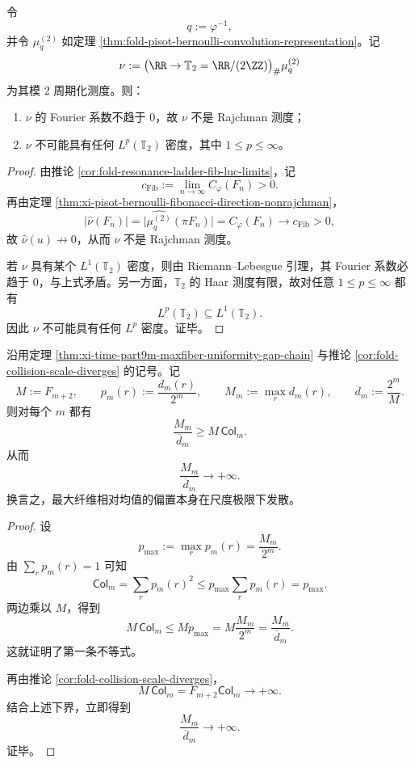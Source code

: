 \begin{corollary}\label{cor:xi-time-part66-periodized-bernoulli-nonrajchman-no-lp}
令
\[
q:=\varphi^{-1},
\]
并令 \(\mu_q^{(2)}\) 如定理 \ref{thm:fold-pisot-bernoulli-convolution-representation}。记
\[
\nu:=\bigl(\RR\to \mathbb T_2=\RR/(2\ZZ)\bigr)_\#\mu_q^{(2)}
\]
为其模 \(2\) 周期化测度。则：
\begin{enumerate}
  \item \(\nu\) 的 Fourier 系数不趋于 \(0\)，故 \(\nu\) 不是 Rajchman 测度；
  \item \(\nu\) 不可能具有任何 \(L^p(\mathbb T_2)\) 密度，其中 \(1\le p\le \infty\)。
\end{enumerate}
\end{corollary}
\begin{proof}
由推论 \ref{cor:fold-resonance-ladder-fib-luc-limits}，记
\[
c_{\mathrm{Fib}}:=\lim_{n\to\infty}C_\varphi(F_n)>0.
\]
再由定理 \ref{thm:xi-pisot-bernoulli-fibonacci-direction-nonrajchman}，
\[
\bigl|\widehat\nu(F_n)\bigr|
=
\bigl|\widehat{\mu_q^{(2)}}(\pi F_n)\bigr|
=
C_\varphi(F_n)
\longrightarrow
c_{\mathrm{Fib}}>0,
\]
故 \(\widehat\nu(u)\not\to 0\)，从而 \(\nu\) 不是 Rajchman 测度。

若 \(\nu\) 具有某个 \(L^1(\mathbb T_2)\) 密度，则由 Riemann--Lebesgue 引理，其 Fourier 系数必趋于 \(0\)，与上式矛盾。另一方面，\(\mathbb T_2\) 的 Haar 测度有限，故对任意 \(1\le p\le\infty\) 都有
\[
L^p(\mathbb T_2)\subseteq L^1(\mathbb T_2).
\]
因此 \(\nu\) 不可能具有任何 \(L^p\) 密度。证毕。
\end{proof}

\begin{theorem}[最大纤维相对均值的放大因子无界]\label{thm:xi-time-part66-maxfiber-over-mean-diverges}
沿用定理 \ref{thm:xi-time-part9m-maxfiber-uniformity-gap-chain} 与推论
\ref{cor:fold-collision-scale-diverges} 的记号。记
\[
M:=F_{m+2},
\qquad
p_m(r):=\frac{d_m(r)}{2^m},
\qquad
M_m:=\max_r d_m(r),
\qquad
\overline d_m:=\frac{2^m}{M}.
\]
则对每个 \(m\) 都有
\[
\boxed{\;
\frac{M_m}{\overline d_m}\ge M\,\mathsf{Col}_m.\;}
\]
从而
\[
\boxed{\;
\frac{M_m}{\overline d_m}\longrightarrow +\infty.\;}
\]
换言之，最大纤维相对均值的偏置本身在尺度极限下发散。
\end{theorem}
\begin{proof}
设
\[
p_{\max}:=\max_r p_m(r)=\frac{M_m}{2^m}.
\]
由 \(\sum_r p_m(r)=1\) 可知
\[
\mathsf{Col}_m=\sum_r p_m(r)^2\le p_{\max}\sum_r p_m(r)=p_{\max}.
\]
两边乘以 \(M\)，得到
\[
M\,\mathsf{Col}_m\le M p_{\max}=M\frac{M_m}{2^m}=\frac{M_m}{\overline d_m}.
\]
这就证明了第一条不等式。

再由推论 \ref{cor:fold-collision-scale-diverges}，
\[
M\,\mathsf{Col}_m=F_{m+2}\mathsf{Col}_m\longrightarrow +\infty.
\]
结合上述下界，立即得到
\[
\frac{M_m}{\overline d_m}\longrightarrow +\infty.
\]
证毕。
\end{proof}

